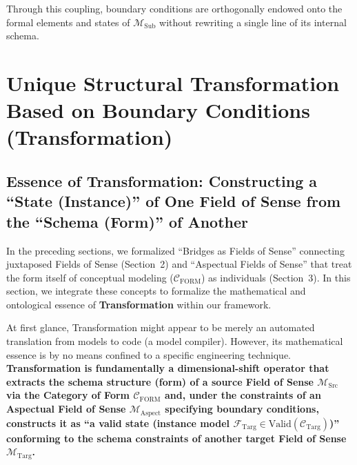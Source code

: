 \documentclass[11pt,a4paper]{article}
\theoremstyle{definition}
\theoremstyle{plain}
\theoremstyle{remark}
\newcommand{\Valid}{\mathrm{Valid}}
\newcommand{\CFORM}{\mathcal{C}_{\mathrm{FORM}}}
\newcommand{\CTarg}{\mathcal{C}_{\mathrm{Targ}}}
\newcommand{\MSrc}{\mathcal{M}_{\mathrm{Src}}}
\newcommand{\MTarg}{\mathcal{M}_{\mathrm{Targ}}}
\newcommand{\MAspect}{\mathcal{M}_{\mathrm{Aspect}}}
\newcommand{\MSub}{\mathcal{M}_{\mathrm{Sub}}}
\begin{document}
Through this coupling, boundary conditions are orthogonally endowed onto the formal elements and states of $\MSub$ without rewriting a single line of its internal schema.

\section{Unique Structural Transformation Based on Boundary Conditions (Transformation)}

\subsection{Essence of Transformation: Constructing a ``State (Instance)'' of One Field of Sense from the ``Schema (Form)'' of Another}
In the preceding sections, we formalized ``Bridges as Fields of Sense'' connecting juxtaposed Fields of Sense (Section~2) and ``Aspectual Fields of Sense'' that treat the form itself of conceptual modeling ($\CFORM$) as individuals (Section~3). In this section, we integrate these concepts to formalize the mathematical and ontological essence of \textbf{Transformation} within our framework.

At first glance, Transformation might appear to be merely an automated translation from models to code (a model compiler). However, its mathematical essence is by no means confined to a specific engineering technique. \textbf{Transformation is fundamentally a dimensional-shift operator that extracts the schema structure (form) of a source Field of Sense $\MSrc$ via the Category of Form $\CFORM$ and, under the constraints of an Aspectual Field of Sense $\MAspect$ specifying boundary conditions, constructs it as ``a valid state (instance model $\mathcal{F}_{\mathrm{Targ}} \in \Valid(\CTarg)$)'' conforming to the schema constraints of another target Field of Sense $\MTarg$.}
\end{document}
